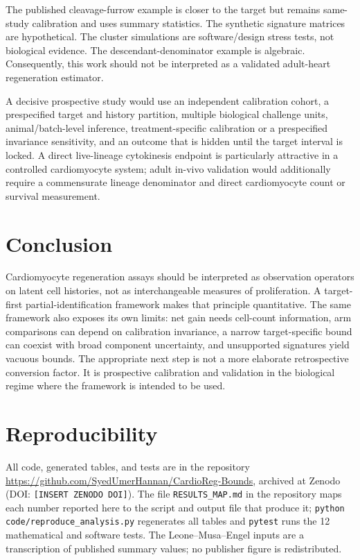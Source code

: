 \documentclass[11pt]{article}
\begin{document}
The published cleavage-furrow example is closer to the target but remains same-study calibration and uses summary statistics. The synthetic signature matrices are hypothetical. The cluster simulations are software/design stress tests, not biological evidence. The descendant-denominator example is algebraic. Consequently, this work should not be interpreted as a validated adult-heart regeneration estimator.

A decisive prospective study would use an independent calibration cohort, a prespecified target and history partition, multiple biological challenge units, animal/batch-level inference, treatment-specific calibration or a prespecified invariance sensitivity, and an outcome that is hidden until the target interval is locked. A direct live-lineage cytokinesis endpoint is particularly attractive in a controlled cardiomyocyte system; adult in-vivo validation would additionally require a commensurate lineage denominator and direct cardiomyocyte count or survival measurement.

\section{Conclusion}
Cardiomyocyte regeneration assays should be interpreted as observation operators on latent cell histories, not as interchangeable measures of proliferation. A target-first partial-identification framework makes that principle quantitative. The same framework also exposes its own limits: net gain needs cell-count information, arm comparisons can depend on calibration invariance, a narrow target-specific bound can coexist with broad component uncertainty, and unsupported signatures yield vacuous bounds. The appropriate next step is not a more elaborate retrospective conversion factor. It is prospective calibration and validation in the biological regime where the framework is intended to be used.

\section*{Reproducibility}
All code, generated tables, and tests are in the repository \url{https://github.com/SyedUmerHannan/CardioReg-Bounds}, archived at Zenodo (DOI: \texttt{[INSERT ZENODO DOI]}). The file \texttt{RESULTS\_MAP.md} in the repository maps each number reported here to the script and output file that produce it; \texttt{python code/reproduce\_analysis.py} regenerates all tables and \texttt{pytest} runs the 12 mathematical and software tests. The Leone--Musa--Engel inputs are a transcription of published summary values; no publisher figure is redistributed.
\end{document}
